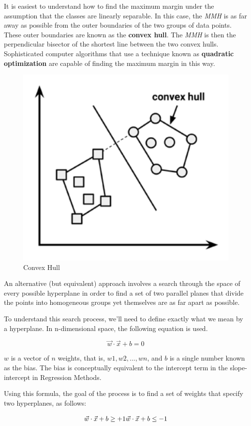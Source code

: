 \documentclass[
]{article}
\begin{document}
It is easiest to understand how to find the maximum margin under the
assumption that the classes are linearly separable. In this case, the
\emph{MMH} is as far away as possible from the outer boundaries of the
two groups of data points. These outer boundaries are known as the
\textbf{convex hull}. The \emph{MMH} is then the perpendicular bisector
of the shortest line between the two convex hulls. Sophisticated
computer algorithms that use a technique known as \textbf{quadratic
optimization} are capable of finding the maximum margin in this way.

\begin{figure}

{\centering \includegraphics[width=0.5\linewidth,]{images/convexhull} 

}

\caption{Convex Hull}\label{fig:fig4}
\end{figure}

An alternative (but equivalent) approach involves a search through the
space of every possible hyperplane in order to find a set of two
parallel planes that divide the points into homogeneous groups yet
themselves are as far apart as possible.

To understand this search process, we'll need to define exactly what we
mean by a hyperplane. In n-dimensional space, the following equation is
used.

\[ \vec w \cdot  \vec x+b=0\]

\(w\) is a vector of \(n\) weights, that is,
\({w 1 , w 2 , ..., w n }\), and \(b\) is a single number known as the
bias. The bias is conceptually equivalent to the intercept term in the
slope-intercept in Regression Methods.

Using this formula, the goal of the process is to find a set of weights
that specify two hyperplanes, as follows:

\[ \vec w \cdot  \vec x+b\geq +1 \\  \vec w \cdot  \vec x+b\leq -1 \]
\end{document}
